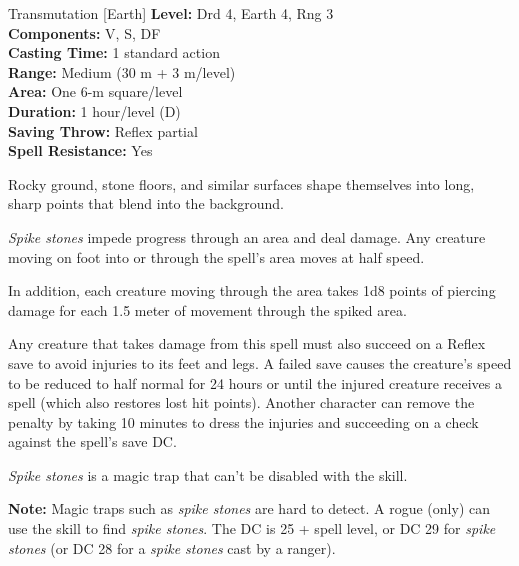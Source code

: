 {Transmutation [Earth]}
{
	\textbf{Level:}
	Drd 4, Earth 4, Rng 3\\
	\textbf{Components:}
	V, S, DF\\
	\textbf{Casting Time:}
	1 standard action\\
	\textbf{Range:}
	Medium (30 m + 3 m/level)\\
	\textbf{Area:}
	One 6-m square/level\\
	\textbf{Duration:}
	1 hour/level (D)\\
	\textbf{Saving Throw:}
	Reflex partial\\
	\textbf{Spell Resistance:}
	Yes\\
}
{
	Rocky ground, stone floors, and similar surfaces shape themselves into long, sharp points that blend into the background.

	\emph{Spike stones} impede progress through an area and deal damage. Any creature moving on foot into or through the spell's area moves at half speed.

	In addition, each creature moving through the area takes 1d8 points of piercing damage for each 1.5 meter of movement through the spiked area.

	Any creature that takes damage from this spell must also succeed on a Reflex save to avoid injuries to its feet and legs. A failed save causes the creature's speed to be reduced to half normal for 24 hours or until the injured creature receives a  spell (which also restores lost hit points). Another character can remove the penalty by taking 10 minutes to dress the injuries and succeeding on a  check against the spell's save DC.

	\emph{Spike stones} is a magic trap that can't be disabled with the  skill.

	\textbf{Note:} Magic traps such as \emph{spike stones} are hard to detect. A rogue (only) can use the  skill to find \emph{spike stones}. The DC is 25 + spell level, or DC 29 for \emph{spike stones} (or DC 28 for a \emph{spike stones} cast by a ranger).

}
